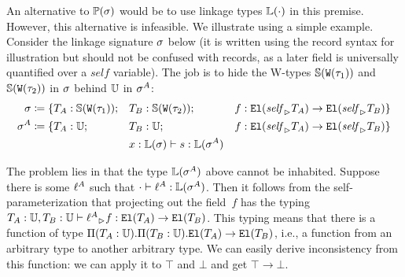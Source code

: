 An alternative to $\mathbb{P}({\sigma})$ would be to use linkage types $\mathbb{L}({\cdot})$ in this premise.
However, this alternative is infeasible.
We illustrate using a simple example.
Consider the linkage signature $\sigma$ below (it is written using the record
syntax for illustration but should not be confused with records, as a later field
is universally quantified over a $\mathit{self}$ variable).
The job is to hide the W-types $\mathbb{S}({\texttt{W}({\tau_1})})$ and
$\mathbb{S}({\texttt{W}({\tau_2})})$ in $\sigma$ behind $\mathbb{U}$ in $\sigma^A$:
%
\begin{align*}
  \sigma &\coloneq \{ T_A : \mathbb{S}({\texttt{W}({\tau_1})}); &&T_B : \mathbb{S}({\texttt{W}({\tau_2})}); &&f : \texttt{El}({{\mathit{self}}_{\rhd}{T_A}}) \to \texttt{El}({{\mathit{self}}_{\rhd}{T_B}}) \} \\
  \sigma^A &\coloneq \{T_A : \mathbb{U}; &&T_B : \mathbb{U}; &&f : \texttt{El}({{\mathit{self}}_{\rhd}{T_A}}) \to \texttt{El}({{\mathit{self}}_{\rhd}{T_B}}) \} \\
  & &&  {x : \mathbb{L}({\sigma})} \vdash {\ensuremath{s}} : {\mathbb{L}({\sigma^A})} 
\end{align*}


The problem lies in that the type $\mathbb{L}({\sigma^A})$ above cannot be inhabited.
Suppose there is some $\ell^A$ such that $\cdot \vdash \ell^A : \mathbb{L}({\sigma^A})$.
Then it follows from the self-parameterization that projecting out the field~$f$
has the typing
$ {T_A : \mathbb{U}, T_B: \mathbb{U}} \vdash {\ensuremath{{\ell^A}_{\rhd}{f}}} : {\texttt{El}({T_A}) \to \texttt{El}({T_B})} $.
This typing means that there is a function of type
$\Pi({T_A}:{\mathbb{U}}).{\Pi({T_B}:{\mathbb{U}}).{\texttt{El}({T_A})
\to \texttt{El}({T_B})}}$, i.e., a function from an arbitrary type to another arbitrary
type. We can easily derive inconsistency from this function:
we can apply it to $\top$ and $\bot$ and get $\top \to \bot$.

